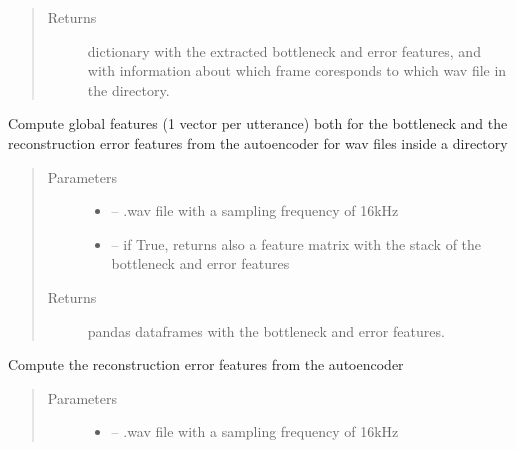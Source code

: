 \documentclass[letterpaper,10pt,english]{sphinxmanual}
\begin{document}
\begin{fulllineitems}
\begin{fulllineitems}
\begin{quote}
\begin{description}
\item[{Returns}] \leavevmode
dictionary with the extracted bottleneck and error features, and with information about which frame coresponds to which wav file in the directory.

\end{description}\end{quote}

\end{fulllineitems}


\begin{fulllineitems}
\label{\detokenize{RepLearning:AEspeech.AEspeech.compute_global_features}}
Compute global features (1 vector per utterance) both for the bottleneck and the reconstruction error features from the autoencoder for wav files inside a directory
\begin{quote}\begin{description}
\item[{Parameters}] \leavevmode\begin{itemize}
\item {} 
 -- .wav file with a sampling frequency of 16kHz

\item {} 
 -- if True, returns also a feature matrix with the stack of the bottleneck and error features

\end{itemize}

\item[{Returns}] \leavevmode
pandas dataframes with the bottleneck and error features.

\end{description}\end{quote}

\end{fulllineitems}


\begin{fulllineitems}
\label{\detokenize{RepLearning:AEspeech.AEspeech.compute_rec_error_features}}
Compute the  reconstruction error features from the autoencoder
\begin{quote}\begin{description}
\item[{Parameters}] \leavevmode\begin{itemize}
\item {} 
 -- .wav file with a sampling frequency of 16kHz


\end{itemize}
\end{description}
\end{quote}
\end{fulllineitems}
\end{fulllineitems}
\end{document}
